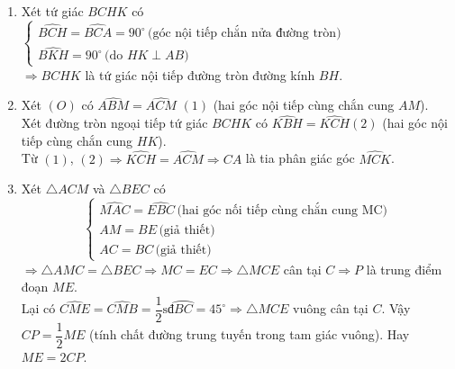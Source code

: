\begin{ex}
{\begin{center}
\begin{tikzpicture}[scale=1]
                        \end{tikzpicture}
                         \end{center}
                \begin{enumerate}
                \item Xét tứ giác $BCHK$ có
                        $\begin{cases} \widehat{BCH}=\widehat{BCA}=90^\circ \,\text{(góc nội tiếp chắn nửa đường tròn)} \\  \widehat{BKH}=90^\circ \,\text{(do $HK\perp AB$)}\end{cases}$\\ 
                        $\Rightarrow BCHK$ là tứ giác nội tiếp đường tròn đường kính $BH$.
                \item Xét $(O)$ có 
                        $\widehat{ABM}=\widehat{ACM}$                   \quad $(1)$ (hai góc nội tiếp cùng chắn cung $AM$).\\
                        Xét đường tròn ngoại tiếp tứ giác $BCHK$ có $\widehat{KBH}=\widehat{KCH}$\quad $(2)$ (hai góc nội tiếp cùng chắn cung $HK$).\\
                        Từ $(1)$, $(2)\Rightarrow \widehat{KCH}=\widehat{ACM}\Rightarrow CA$ là tia phân giác góc $\widehat{MCK}$.
                \item Xét $\triangle ACM$ và $\triangle BEC$ có
                        $$\begin{cases} \widehat{MAC}=\widehat{EBC}\, \text{(hai góc nối tiếp cùng chắn cung MC)}\\ AM=BE\, \text{(giả thiết)}\\AC=BC\, \text{(giả thiết)}\end{cases}$$
                        $\Rightarrow \triangle AMC=\triangle BEC\Rightarrow MC=EC\Rightarrow \triangle MCE$ cân tại $C\Rightarrow P$ là trung điểm đoạn $ME$.\\
                        Lại có $\widehat{CME}=\widehat{CMB}=\dfrac{1}{2}\text{sđ}\wideparen{BC}=45^\circ \Rightarrow \triangle MCE$ vuông cân tại $C$. Vậy $CP=\dfrac{1}{2}ME$ (tính chất đường trung tuyến trong tam giác vuông). Hay $ME=2CP$.
                
                \end{enumerate}
	}
\end{ex}


